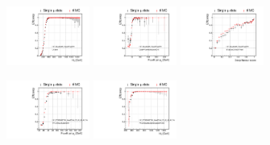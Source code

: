 \begin{figure}[htp!]
\captionsetup[subfigure]{justification=centering}
    \centering
      \begin{subfigure}{\textwidth}
  \centering
          \caption{}
\includegraphics[width=0.3\textwidth]{Figures/AnalysisStrategy/triggereff/plots_2016/Quad45_Efficiency_L1filterHT.pdf}
\includegraphics[width=0.3\textwidth]{Figures/AnalysisStrategy/triggereff/plots_2016/Quad45_Efficiency_QuadPFCentralJetLooseID45.pdf}
\includegraphics[width=0.3\textwidth]{Figures/AnalysisStrategy/triggereff/plots_2016/Quad45_Efficiency_BTagCaloCSVp087Triple.pdf}\\
      \end{subfigure}
      \begin{subfigure}{\textwidth}
  \centering
          \caption{}
\includegraphics[width=0.3\textwidth]{Figures/AnalysisStrategy/triggereff/plots_2017/Quad_75_60_45_40_3b_Efficiency_4PFCentralJetLooseID40.pdf}
\includegraphics[width=0.3\textwidth]{Figures/AnalysisStrategy/triggereff/plots_2017/Quad_75_60_45_40_3b_Efficiency_PFCentralJetsLooseIDQuad30HT300.pdf}

\end{subfigure}
\end{figure}

